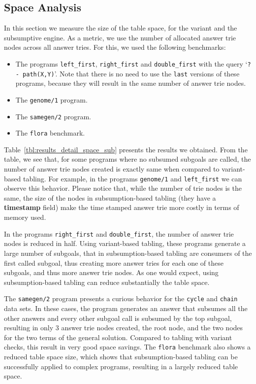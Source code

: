 \subsection{Space Analysis}

In this section we measure the size of the table space, for the variant and the subsumptive engine.
As a metric, we use the number of allocated answer trie nodes across all answer tries.
For this, we used the following benchmarks:

\begin{itemize}
   \item The programs \texttt{left\_first}, \texttt{right\_first} and \texttt{double\_first} with the query `\texttt{?-~path(X,Y)}'. Note that there is no need to use
   the \texttt{last} versions of these programs, because they will result in the same number of answer trie nodes.
   
   \item The \texttt{genome/1} program.
   
   \item The \texttt{samegen/2} program.
   
   \item The \texttt{flora} benchmark.
\end{itemize}

Table~\ref{tbl:results_detail_space_sub} presents the results we obtained. From the table, we see that,
for some programs where no subsumed subgoals are called, the number of answer trie nodes created is
exactly same when compared to variant-based tabling. For example, in the programs \texttt{genome/1} and
\texttt{left\_first} we can observe this behavior. Please notice that, while the number of trie nodes is
the same, the size of the nodes in subsumption-based tabling (they have a \textbf{timestamp} field) make
the time stamped answer trie more costly in terms of memory used.

In the programs \texttt{right\_first} and \texttt{double\_first}, the number of answer trie nodes
is reduced in half. Using variant-based tabling, these programs generate a large number of subgoals,
that in subsumption-based tabling are consumers of the first called subgoal, thus creating more
answer tries for each one of these subgoals, and thus more answer trie nodes. As one would expect,
using subsumption-based tabling can reduce substantially the table space.

The \texttt{samegen/2} program presents a curious behavior for the \texttt{cycle} and \texttt{chain}
data sets. In these cases, the program generates an answer that subsumes all the other answers and
every other subgoal call is subsumed by the top subgoal, resulting in only 3 answer trie nodes created,
the root node, and the two nodes for the two terms of the general solution. Compared to tabling with
variant checks, this result in very good space savings.
The \texttt{flora} benchmark also shows a reduced table space size, which shows that subsumption-based
tabling can be successfully applied to complex programs, resulting in a largely reduced
table space.

